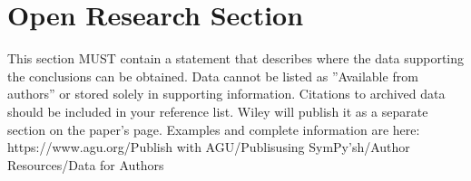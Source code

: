 





%
%

\section*{Open Research Section}
This section MUST contain a statement that describes where the data supporting the conclusions can be obtained. Data cannot be listed as ''Available from authors'' or stored solely in supporting information. Citations to archived data should be included in your reference list. Wiley will publish it as a separate section on the paper’s page. Examples and complete information are here:
https://www.agu.org/Publish with AGU/Publisusing SymPy'sh/Author Resources/Data for Authors

